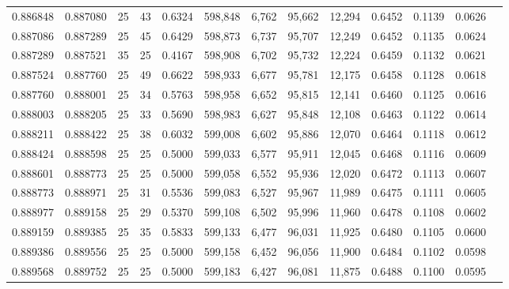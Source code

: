 \begin{tabular}{rrrrrrrrrrrrr}
0.886848 & 0.887080 &    25 &  43 &                                     0.6324 & 598,848 &   6,762 &  95,662 &  12,294 & 0.6452 & 0.1139 & 0.0626 \\
0.887086 & 0.887289 &    25 &  45 &                                     0.6429 & 598,873 &   6,737 &  95,707 &  12,249 & 0.6452 & 0.1135 & 0.0624 \\
0.887289 & 0.887521 &    35 &  25 &                                     0.4167 & 598,908 &   6,702 &  95,732 &  12,224 & 0.6459 & 0.1132 & 0.0621 \\
0.887524 & 0.887760 &    25 &  49 &                                     0.6622 & 598,933 &   6,677 &  95,781 &  12,175 & 0.6458 & 0.1128 & 0.0618 \\
0.887760 & 0.888001 &    25 &  34 &                                     0.5763 & 598,958 &   6,652 &  95,815 &  12,141 & 0.6460 & 0.1125 & 0.0616 \\
0.888003 & 0.888205 &    25 &  33 &                                     0.5690 & 598,983 &   6,627 &  95,848 &  12,108 & 0.6463 & 0.1122 & 0.0614 \\
0.888211 & 0.888422 &    25 &  38 &                                     0.6032 & 599,008 &   6,602 &  95,886 &  12,070 & 0.6464 & 0.1118 & 0.0612 \\
0.888424 & 0.888598 &    25 &  25 &                                     0.5000 & 599,033 &   6,577 &  95,911 &  12,045 & 0.6468 & 0.1116 & 0.0609 \\
0.888601 & 0.888773 &    25 &  25 &                                     0.5000 & 599,058 &   6,552 &  95,936 &  12,020 & 0.6472 & 0.1113 & 0.0607 \\
0.888773 & 0.888971 &    25 &  31 &                                     0.5536 & 599,083 &   6,527 &  95,967 &  11,989 & 0.6475 & 0.1111 & 0.0605 \\
0.888977 & 0.889158 &    25 &  29 &                                     0.5370 & 599,108 &   6,502 &  95,996 &  11,960 & 0.6478 & 0.1108 & 0.0602 \\
0.889159 & 0.889385 &    25 &  35 &                                     0.5833 & 599,133 &   6,477 &  96,031 &  11,925 & 0.6480 & 0.1105 & 0.0600 \\
0.889386 & 0.889556 &    25 &  25 &                                     0.5000 & 599,158 &   6,452 &  96,056 &  11,900 & 0.6484 & 0.1102 & 0.0598 \\
0.889568 & 0.889752 &    25 &  25 &                                     0.5000 & 599,183 &   6,427 &  96,081 &  11,875 & 0.6488 & 0.1100 & 0.0595 \\

\end{tabular}
